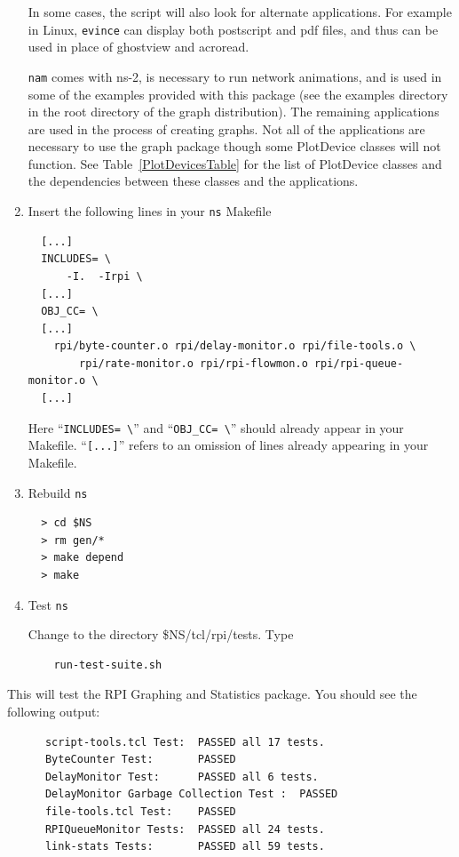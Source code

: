 \documentclass[11pt]{article}
\begin{document}
\begin{enumerate}
In some cases, the script will also look for alternate applications.
For example in Linux, \verb|evince| can display both postscript and
pdf files, and thus can be used in place of ghostview and acroread.

\noindent
\verb|nam| comes with ns-2, is necessary to run network animations,
and is used in some of the examples provided with this package (see
the examples directory in the root directory of the graph
distribution).  The remaining applications are used in the process of
creating graphs.  Not all of the applications are necessary to use the
graph package though some PlotDevice classes will not function.  See
Table~\ref{PlotDevicesTable} for the list of PlotDevice classes and
the dependencies between these classes and the applications.


\item{Insert the following lines in your \verb|ns| Makefile}

\begin{verbatim}
  [...]
  INCLUDES= \
      -I.  -Irpi \
  [...]
  OBJ_CC= \
  [...]
	rpi/byte-counter.o rpi/delay-monitor.o rpi/file-tools.o \
        rpi/rate-monitor.o rpi/rpi-flowmon.o rpi/rpi-queue-monitor.o \
  [...]      
\end{verbatim}

Here ``\verb|INCLUDES= \|'' and ``\verb|OBJ_CC= \|'' should
already appear in your Makefile.  ``\verb|[...]|'' refers to an omission
of lines already appearing in your Makefile.

\item{Rebuild \verb|ns|}

\begin{verbatim}
  > cd $NS
  > rm gen/* 
  > make depend
  > make
\end{verbatim}


\item{Test \verb|ns|}

Change to the directory \$NS/tcl/rpi/tests.  Type 
  \begin{verbatim}
    run-test-suite.sh
  \end{verbatim}
\end{enumerate}

This will test the RPI Graphing and Statistics package.  You should
see the following output:

\begin{verbatim}
      script-tools.tcl Test:  PASSED all 17 tests.
      ByteCounter Test:       PASSED
      DelayMonitor Test:      PASSED all 6 tests.
      DelayMonitor Garbage Collection Test :  PASSED
      file-tools.tcl Test:    PASSED
      RPIQueueMonitor Tests:  PASSED all 24 tests.
      link-stats Tests:       PASSED all 59 tests.
\end{verbatim}
\end{document}
